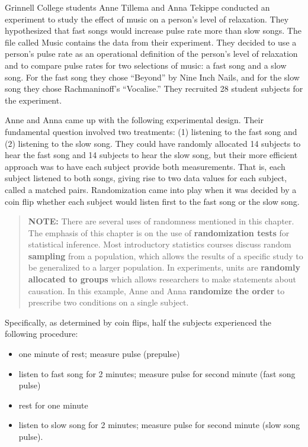 \documentclass[
]{report}
\providecommand{\tightlist}{%
  \setlength{\itemsep}{0pt}\setlength{\parskip}{0pt}}
\begin{document}
Grinnell College students Anne Tillema and Anna Tekippe conducted an experiment to study the effect of music on a person's level of relaxation. They hypothesized that fast songs would increase pulse rate more than slow songs. The file called Music contains the data from their experiment. They decided to use a person's pulse rate as an operational definition of the person's level of relaxation and to compare pulse rates for two selections of music: a fast song and a slow song. For the fast song they chose ``Beyond'' by Nine Inch Nails, and for the slow song they chose Rachmaninoff's ``Vocalise.'' They recruited 28 student subjects for the experiment.

Anne and Anna came up with the following experimental design. Their fundamental question
involved two treatments: (1) listening to the fast song and (2) listening to the slow song. They could have randomly allocated 14 subjects to hear the fast song and 14 subjects to hear the slow song, but their more efficient approach was to have each subject provide both measurements. That is, each subject listened to both songs, giving rise to two data values for each subject, called a matched pairs. Randomization came into play when it was decided by a coin flip whether each subject would listen first to the fast song or the slow song.

\begin{quote}
\textbf{NOTE:} There are several uses of randomness mentioned in this chapter. The emphasis of this chapter is on the use of \textbf{randomization tests} for statistical inference. Most introductory statistics courses discuss random \textbf{sampling} from a population, which allows the results of a specific study to be generalized to a larger
population. In experiments, units are \textbf{randomly allocated to groups} which allows researchers to make statements about causation. In this example, Anne and Anna \textbf{randomize the order} to prescribe two conditions on a single subject.
\end{quote}

Specifically, as determined by coin flips, half the subjects experienced the following procedure:

\begin{itemize}
\tightlist
\item
  one minute of rest; measure pulse (prepulse)
\item
  listen to fast song for 2 minutes; measure pulse for second minute (fast song pulse)
\item
  rest for one minute
\item
  listen to slow song for 2 minutes; measure pulse for second minute (slow song pulse).
\end{itemize}
\end{document}
